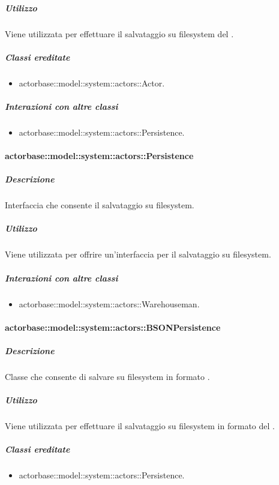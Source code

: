 \documentclass{scalatekids-article}
\begin{document}
\subparagraph{Utilizzo}

Viene utilizzata per effettuare il salvataggio su filesystem del
.

\subparagraph{Classi ereditate}

\begin{itemize}
\item actorbase::model::system::actors::Actor.
\end{itemize}

\subparagraph{Interazioni con altre classi}

\begin{itemize}
\item actorbase::model::system::actors::Persistence.
\end{itemize}

\paragraph{actorbase::model::system::actors::Persistence}

\subparagraph{Descrizione}

Interfaccia che consente il salvataggio su filesystem.

\subparagraph{Utilizzo}

Viene utilizzata per offrire un'interfaccia per il salvataggio su filesystem.

\subparagraph{Interazioni con altre classi}

\begin{itemize}
\item actorbase::model::system::actors::Warehouseman.
\end{itemize}

\paragraph{actorbase::model::system::actors::BSONPersistence}

\subparagraph{Descrizione}

Classe che consente di salvare su filesystem in formato .

\subparagraph{Utilizzo}

Viene utilizzata per effettuare il salvataggio su filesystem in formato
 del .

\subparagraph{Classi ereditate}

\begin{itemize}
\item actorbase::model::system::actors::Persistence.
\end{itemize}
\end{document}
